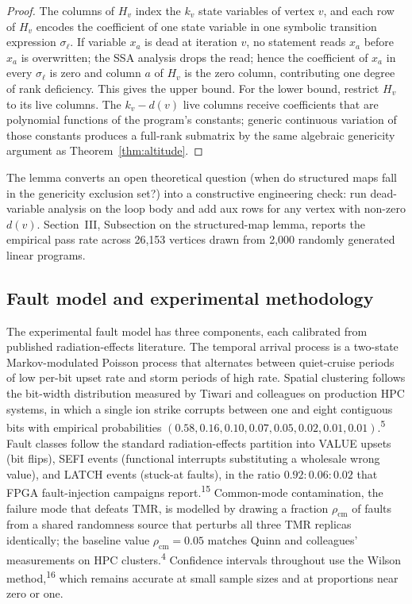 \documentclass[12pt,a4paper]{article}
\theoremstyle{plain}
\theoremstyle{definition}
\begin{document}
\begin{proof}
The columns of $H_v$ index the $k_v$ state variables of vertex $v$, and each row of $H_v$ encodes the coefficient of one state variable in one symbolic transition expression $\sigma_\ell$. If variable $x_a$ is dead at iteration $v$, no statement reads $x_a$ before $x_a$ is overwritten; the SSA analysis drops the read; hence the coefficient of $x_a$ in every $\sigma_\ell$ is zero and column $a$ of $H_v$ is the zero column, contributing one degree of rank deficiency. This gives the upper bound. For the lower bound, restrict $H_v$ to its live columns. The $k_v - d(v)$ live columns receive coefficients that are polynomial functions of the program's constants; generic continuous variation of those constants produces a full-rank submatrix by the same algebraic genericity argument as Theorem~\ref{thm:altitude}.
\end{proof}

The lemma converts an open theoretical question (when do structured maps fall in the genericity exclusion set?) into a constructive engineering check: run dead-variable analysis on the loop body and add aux rows for any vertex with non-zero $d(v)$. Section~III, Subsection on the structured-map lemma, reports the empirical pass rate across 26{,}153 vertices drawn from 2{,}000 randomly generated linear programs.

\subsection{Fault model and experimental methodology}

The experimental fault model has three components, each calibrated from published radiation-effects literature. The temporal arrival process is a two-state Markov-modulated Poisson process that alternates between quiet-cruise periods of low per-bit upset rate and storm periods of high rate. Spatial clustering follows the bit-width distribution measured by Tiwari and colleagues on production HPC systems, in which a single ion strike corrupts between one and eight contiguous bits with empirical probabilities $(0.58, 0.16, 0.10, 0.07, 0.05, 0.02, 0.01, 0.01)$.\textsuperscript{5} Fault classes follow the standard radiation-effects partition into VALUE upsets (bit flips), SEFI events (functional interrupts substituting a wholesale wrong value), and LATCH events (stuck-at faults), in the ratio $0.92 : 0.06 : 0.02$ that FPGA fault-injection campaigns report.\textsuperscript{15} Common-mode contamination, the failure mode that defeats TMR, is modelled by drawing a fraction $\rho_{\mathrm{cm}}$ of faults from a shared randomness source that perturbs all three TMR replicas identically; the baseline value $\rho_{\mathrm{cm}} = 0.05$ matches Quinn and colleagues' measurements on HPC clusters.\textsuperscript{4} Confidence intervals throughout use the Wilson method,\textsuperscript{16} which remains accurate at small sample sizes and at proportions near zero or one.
\end{document}
